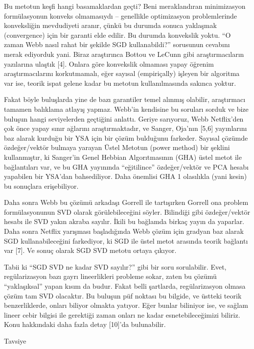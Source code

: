 \documentclass[12pt,fleqn]{article}\usepackage{../../common}
\begin{document}
Bu metotun keşfi hangi basamaklardan geçti? Beni meraklandıran minimizasyon
formülasyonun konveks olmamasıydı -- genellikle optimizasyon problemlerinde
konveksliğin mevdudiyeti aranır, çünkü bu durumda sonuca yaklaşmak (convergence)
için bir garanti elde edilir. Bu durumda konvekslik yoktu. ``O zaman Webb nasıl
rahat bir şekilde SGD kullanabildi?'' sorusunun cevabını merak ediyorduk
yani. Biraz araştırınca Bottou ve LeCunn gibi araştırmacıların yazılarına
ulaştık [4]. Onlara göre konvekslik olmaması yapay öğrenim araştırmacılarını
korkutmamalı, eğer sayısal (empiriçally) işleyen bir algoritma var ise, teorik
ispat gelene kadar bu metotun kullanılmasında sakınca yoktur.

Fakat böyle buluşlarda yine de bazı garantiler temel alınmış olabilir,
araştırmacı tamamen balıklama atlayış yapmaz. Webb'in kendisine bu soruları
sorduk ve bize buluşun hangi seviyelerden geçtiğini anlattı. Geriye sarıyoruz,
Webb Netflix'den çok önce yapay sınır ağlarını araştırmaktadır, ve Sanger,
Oja'nın [5,6] yayınlarını baz alarak kurduğu bir YSA için bir çözüm bulduğunu
farkeder. Sayısal çözümde özdeğer/vektör bulmaya yarayan Üstel Metotun (power
method) bir şeklini kullanmıştır, ki Sanger'in Genel Hebbian Algorıtmasının
(GHA) üstel metot ile bağlantıları var, ve bu GHA yayınında ``eğitilince''
özdeğer/vektör ve PCA hesabı yapabilen bir YSA'dan bahsediliyor. Daha önemlisi
GHA 1 olasılıkla (yani kesin) bu sonuçlara erişebiliyor.

Daha sonra Webb bu çözümü arkadaşı Gorrell ile tartışırken Gorrell ona
problem formülasyonunun SVD olarak görülebileceğini söyler. Bilindiği gibi
özdeğer/vektör hesabı ile SVD yakın akraba sayılır. İkili bu bağlamda
birkaç yayın da yaparlar. Daha sonra Netflix yarışması başladığında Webb
çözüm için gradyan baz alarak SGD kullanabileceğini farkediyor, ki SGD ile
üstel metot arasında teorik bağlantı var [7]. Ve sonuç olarak SGD SVD
metotu ortaya çıkıyor.

Tabii ki ``SGD SVD ne kadar SVD sayılır?'' gibi bir soru sorulabilir. Evet,
regülarizasyon bazı gayrı lineerlikleri probleme sokar, zaten bu çözümü
``yaklaşıksal'' yapan kısım da budur. Fakat belli şartlarda, regülarizasyon
olmasa çözüm tam SVD olacaktır. Bu buluşun püf noktası bu bilgide, ve üstteki
teorik benzerliklerde, onları biliyor olmakta yatıyor. Eğer bunlar biliniyor
ise, ve sağlam lineer cebir bilgisi ile gerektiği zaman onları ne kadar
esnetebileceğimizi biliriz. Konu hakkındaki daha fazla detay [10]'da
bulunabilir.

Tavsiye
\end{document}
